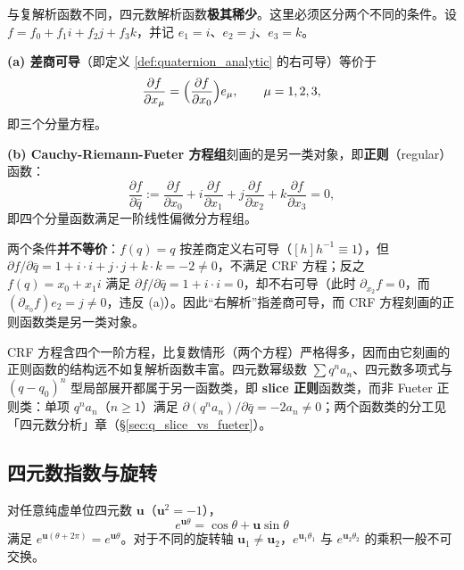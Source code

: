 \begin{remark}[与复解析的结构性差异]\label{rem:quaternion_analytic_difference}
与复解析函数不同，四元数解析函数\textbf{极其稀少}。这里必须区分两个不同的条件。设 $f = f_0 + f_1 i + f_2 j + f_3 k$，并记 $e_1 = i$、$e_2 = j$、$e_3 = k$。

\textbf{(a) 差商可导}（即定义 \ref{def:quaternion_analytic} 的右可导）等价于
\[
\frac{\partial f}{\partial x_\mu} = \Bigl(\frac{\partial f}{\partial x_0}\Bigr) e_\mu, \qquad \mu = 1, 2, 3,
\]
即三个分量方程。

\textbf{(b) Cauchy-Riemann-Fueter 方程组}刻画的是另一类对象，即\textbf{正则}（regular）函数：
\[
\frac{\partial f}{\partial \bar q} := \frac{\partial f}{\partial x_0} + i\frac{\partial f}{\partial x_1} + j\frac{\partial f}{\partial x_2} + k\frac{\partial f}{\partial x_3} = 0,
\]
即四个分量函数满足一阶线性偏微分方程组。

两个条件\textbf{并不等价}：$f(q) = q$ 按差商定义右可导（$[h]h^{-1} \equiv 1$），但 $\partial f/\partial\bar q = 1 + i\cdot i + j\cdot j + k\cdot k = -2 \neq 0$，不满足 CRF 方程；反之 $f(q) = x_0 + x_1 i$ 满足 $\partial f/\partial\bar q = 1 + i\cdot i = 0$，却不右可导（此时 $\partial_{x_2}f = 0$，而 $(\partial_{x_0}f)e_2 = j \neq 0$，违反 (a)）。因此“右解析”指差商可导，而 CRF 方程刻画的正则函数类是另一类对象。

CRF 方程含四个一阶方程，比复数情形（两个方程）严格得多，因而由它刻画的正则函数的结构远不如复解析函数丰富。四元数幂级数 $\sum q^n a_n$、四元数多项式与 $(q-q_0)^n$ 型局部展开都属于另一函数类，即 \textbf{slice 正则}函数类，而非 Fueter 正则类：单项 $q^n a_n$（$n\ge 1$）满足 $\partial(q^n a_n)/\partial\bar q=-2a_n\neq 0$；两个函数类的分工见「四元数分析」章（\S\ref{sec:q_slice_vs_fueter}）。
\end{remark}

\subsection{四元数指数与旋转}

\begin{proposition}[四元数指数函数的旋转周期性]\label{prop:quaternion_exp_rotation}
对任意纯虚单位四元数 $\mathbf{u}$（$\mathbf{u}^2 = -1$），
\[
e^{\mathbf{u}\theta} = \cos\theta + \mathbf{u}\sin\theta
\]
满足 $e^{\mathbf{u}(\theta + 2\pi)} = e^{\mathbf{u}\theta}$。对于不同的旋转轴 $\mathbf{u}_1 \neq \mathbf{u}_2$，$e^{\mathbf{u}_1\theta_1}$ 与 $e^{\mathbf{u}_2\theta_2}$ 的乘积一般不可交换。
\end{proposition}

